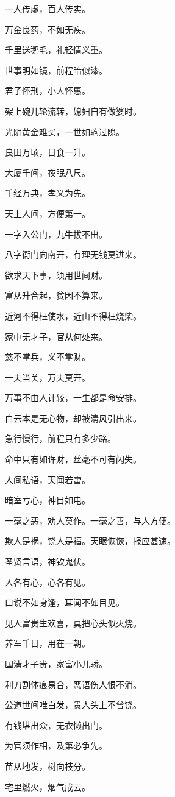 \documentclass[12pt,oneside]{book}
\begin{document}
一人传虚，百人传实。

万金良药，不如无疾。

千里送鹅毛，礼轻情义重。

世事明如镜，前程暗似漆。

君子怀刑，小人怀惠。

架上碗儿轮流转，媳妇自有做婆时。

光阴黄金难买，一世如驹过隙。

良田万顷，日食一升。

大厦千间，夜眠八尺。

千经万典，孝义为先。

天上人间，方便第一。

一字入公门，九牛拔不出。

八字衙门向南开，有理无钱莫进来。

欲求天下事，须用世间财。

富从升合起，贫因不算来。

近河不得枉使水，近山不得枉烧柴。

家中无才子，官从何处来。

慈不掌兵，义不掌财。

一夫当关，万夫莫开。

万事不由人计较，一生都是命安排。

白云本是无心物，却被淸风引出来。

急行慢行，前程只有多少路。

命中只有如许财，丝毫不可有闪失。

人间私语，天闻若雷。

暗室亏心，神目如电。

一毫之恶，劝人莫作。一毫之善，与人方便。

欺人是祸，饶人是福。天眼恢恢，报应甚速。

圣贤言语，神钦鬼伏。

人各有心，心各有见。

口说不如身逢，耳闻不如目见。

见人富贵生欢喜，莫把心头似火烧。

养军千日，用在一朝。

国淸才子贵，家富小儿骄。

利刀割体痕易合，恶语伤人恨不消。

公道世间唯白发，贵人头上不曾饶。

有钱堪出众，无衣懒出门。

为官须作相，及第必争先。

苗从地发，树向枝分。

宅里燃火，烟气成云。
\end{document}
